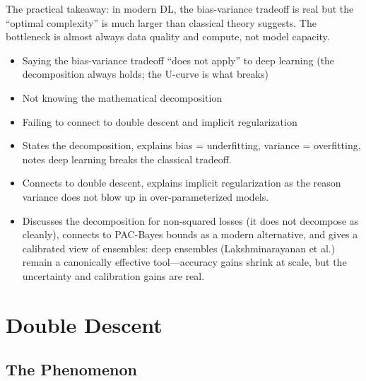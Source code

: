 \begin{interviewq}
The practical takeaway: in modern DL, the bias-variance tradeoff is real but the ``optimal complexity'' is much larger than classical theory suggests. The bottleneck is almost always data quality and compute, not model capacity.

\redflags
\begin{itemize}
    \item Saying the bias-variance tradeoff ``does not apply'' to deep learning (the decomposition always holds; the U-curve is what breaks)
    \item Not knowing the mathematical decomposition
    \item Failing to connect to double descent and implicit regularization
\end{itemize}


\goodgreat
\begin{itemize}
    \item {} States the decomposition, explains bias = underfitting, variance = overfitting, notes deep learning breaks the classical tradeoff.
    \item {} Connects to double descent, explains implicit regularization as the reason variance does not blow up in over-parameterized models.
    \item {} Discusses the decomposition for non-squared losses (it does not decompose as cleanly), connects to PAC-Bayes bounds as a modern alternative, and gives a calibrated view of ensembles: deep ensembles (Lakshminarayanan et al.) remain a canonically effective tool---accuracy gains shrink at scale, but the uncertainty and calibration gains are real.
\end{itemize}

\end{interviewq}

\section{Double Descent}
\label{sec:double_descent}

\subsection{The Phenomenon}


